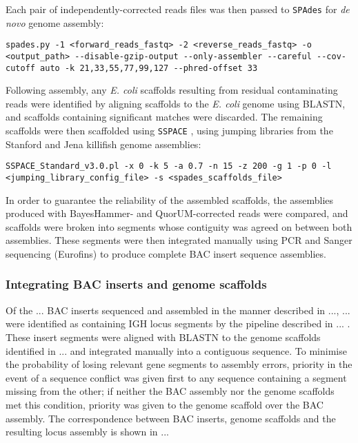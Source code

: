 Each pair of independently-corrected reads files was then passed to \lstinline{SPAdes} for \textit{de novo} genome assembly:

\begin{lstlisting}
spades.py -1 <forward_reads_fastq> -2 <reverse_reads_fastq> -o <output_path> --disable-gzip-output --only-assembler --careful --cov-cutoff auto -k 21,33,55,77,99,127 --phred-offset 33
\end{lstlisting}

Following assembly, any \textit{E. coli} scaffolds resulting from residual contaminating reads were identified by aligning scaffolds to the \textit{E. coli} genome using BLASTN, and scaffolds containing significant matches were discarded. The remaining scaffolds were then scaffolded using \lstinline{SSPACE} \parencite{boetzer2011sspace}, using jumping libraries from the Stanford and Jena killifish genome assemblies:

\begin{lstlisting}
SSPACE_Standard_v3.0.pl -x 0 -k 5 -a 0.7 -n 15 -z 200 -g 1 -p 0 -l <jumping_library_config_file> -s <spades_scaffolds_file>
\end{lstlisting}

In order to guarantee the reliability of the assembled scaffolds, the assemblies produced with BayesHammer- and QuorUM-corrected reads were compared, and scaffolds were broken into segments whose contiguity was agreed on between both assemblies. These segments were then integrated manually using PCR %
and Sanger sequencing (Eurofins) to produce complete BAC insert sequence assemblies. 

\subsubsection{Integrating BAC inserts and genome scaffolds}

Of the ... BAC inserts sequenced and assembled in the manner described in ..., ... were identified as containing IGH locus segments by the pipeline described in ... . These insert segments were aligned with BLASTN to the genome scaffolds identified in ... and integrated manually into a contiguous sequence. To minimise the probability of losing relevant gene segments to assembly errors, priority in the event of a sequence conflict was given first to any sequence containing a segment missing from the other; if neither the BAC assembly nor the genome scaffolds met this condition, priority was given to the genome scaffold over the BAC assembly. The correspondence between BAC inserts, genome scaffolds and the resulting locus assembly is shown in ...

